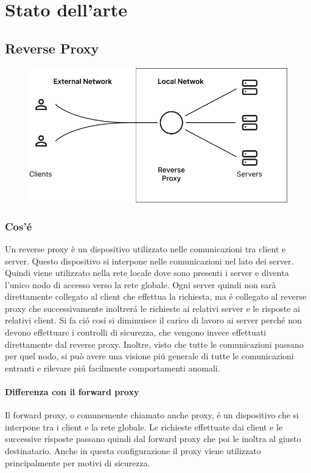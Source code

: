 \chapter{Stato dell'arte}
\label{cha:statoArte}

\section{Reverse Proxy}
\begin{figure}[h!]
  \centering
  \includegraphics[width=.6\textwidth]{images/schema.png}
\end{figure}

\subsection{Cos'é}
Un reverse proxy è un dispositivo utilizzato nelle comunicazioni tra client e server. Questo dispositivo si interpone nelle comunicazioni nel lato dei server. Quindi viene utilizzato nella rete locale dove sono presenti i server e diventa l'unico nodo di accesso verso la rete globale. Ogni server quindi non sarà direttamente collegato al client che effettua la richiesta, ma é collegato al reverse proxy che successivamente inoltrerá le richieste ai relativi server e le risposte ai relativi client. Si fa ció cosí si diminuisce il carico di lavoro ai server perché non devono effettuare i controlli di sicurezza, che vengono invece effettuati direttamente dal reverse proxy. Inoltre, visto che tutte le comunicazioni passano per quel nodo, si può avere una visione piú generale di tutte le comunicazioni entranti e rilevare piú facilmente comportamenti anomali.
\subsubsection{Differenza con il forward proxy}
Il forward proxy, o comunemente chiamato anche proxy, é un dispositivo che si interpone tra i client e la rete globale. Le richieste effettuate dai client e le successive risposte passano quindi dal forward proxy che poi le inoltra al giusto destinatario. Anche in questa configurazione il proxy viene utilizzato principalmente per motivi di sicurezza.

